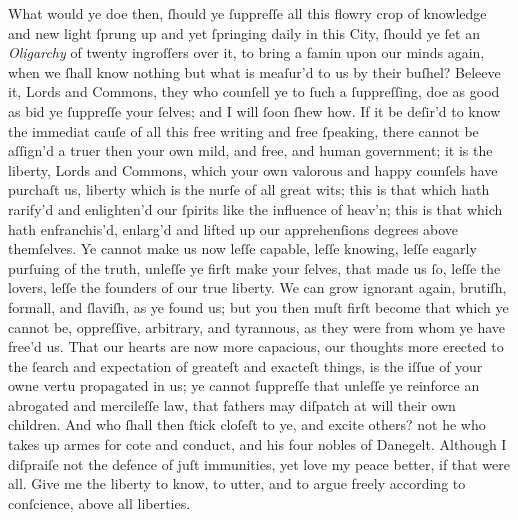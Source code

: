 What would ye doe then, ſhould ye ſuppreſſe all this flowry crop of knowledge
and new light ſprung up and yet ſpringing daily in this City, ſhould ye ſet an
\textit{Oligarchy} of twenty ingroſſers over it, to bring a famin upon our minds
again, when we ſhall know nothing but what is meaſur'd to us by their buſhel?
Beleeve it, Lords and Commons, they who counſell ye to ſuch a ſuppreſſing, doe
as good as bid ye ſuppreſſe your ſelves; and I will ſoon ſhew how.  If it be
deſir'd to know the immediat cauſe of all this free writing and free ſpeaking,
there cannot be aſſign'd a truer then your own mild, and free, and human
government; it is the liberty, Lords and Commons, which your own valorous and
happy counſels have purchaſt us, liberty which is the nurſe of all great wits;
this is that which hath rarify'd and enlighten'd our ſpirits like the influence
of heav'n; this is that which hath enfranchis'd, enlarg'd and lifted up our
apprehenſions degrees above themſelves.  Ye cannot make us now leſſe capable,
leſſe knowing, leſſe eagarly purſuing of the truth, unleſſe ye firſt make your
ſelves, that made us ſo, leſſe the lovers, leſſe the founders of our true
liberty.  We can grow ignorant again, brutiſh, formall, and ſlaviſh, as ye found
us; but you then muſt firſt become that which ye cannot be, oppreſſive,
arbitrary, and tyrannous, as they were from whom ye have free'd us.  That our
hearts are now more capacious, our thoughts more erected to the ſearch and
expectation of greateſt and exacteſt things, is the iſſue of your owne vertu
propagated in us; ye cannot ſuppreſſe that unleſſe ye reinforce an abrogated and
mercileſſe law, that fathers may diſpatch at will their own children.  And who
ſhall then ſtick cloſeſt to ye, and excite others? not he who takes up armes for
cote and conduct, and his four nobles of Danegelt.  Although I diſpraiſe not the
defence of juſt immunities, yet love my peace better, if that were all.  Give me
the liberty to know, to utter, and to argue freely according to conſcience,
above all liberties.

